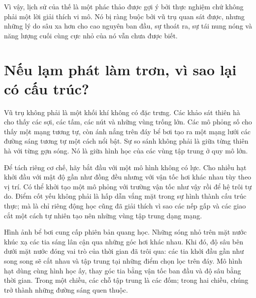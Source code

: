 Vì vậy, lịch sử của thế là một phác thảo được gợi ý bởi thực nghiệm chứ không phải một lời giải thích vi mô. Nó bị ràng buộc bởi vũ trụ quan sát được, nhưng những lý do sâu xa hơn cho cao nguyên ban đầu, sự thoát ra, sự tái nung nóng và năng lượng cuối cùng cực nhỏ của nó vẫn chưa được biết.

\section{Nếu lạm phát làm trơn, vì sao lại có cấu trúc?}

Vũ trụ không phải là một khối khí không có đặc trưng. Các khảo sát thiên hà cho thấy các sợi, các tấm, các nút và những vùng trống lớn. Các mô phỏng số cho thấy một mạng tương tự, còn ánh nắng trên đáy bể bơi tạo ra một mạng lưới các đường sáng tương tự một cách nổi bật. Sự so sánh không phải là giữa từng thiên hà với từng gợn sóng. Nó là giữa hình học của các vùng tập trung ở quy mô lớn.

Để tách riêng cơ chế, hãy bắt đầu với một mô hình không có lực. Cho nhiều hạt khởi đầu với mật độ gần như đồng đều nhưng với vận tốc hơi khác nhau tùy theo vị trí. Có thể khởi tạo một mô phỏng với trường vận tốc như vậy rồi để hệ trôi tự do. Điểm cốt yếu không phải là hấp dẫn vắng mặt trong sự hình thành cấu trúc thực; mà là chỉ riêng động học cũng đã giải thích vì sao các nếp gấp và các giao cắt một cách tự nhiên tạo nên những vùng tập trung dạng mạng.

\begin{classroomqa}
\end{classroomqa}

Hình ảnh bể bơi cung cấp phiên bản quang học. Những sóng nhỏ trên mặt nước khúc xạ các tia sáng lân cận qua những góc hơi khác nhau. Khi đó, độ sâu bên dưới mặt nước đóng vai trò của thời gian đã trôi qua: các tia khởi đầu gần như song song sẽ cắt nhau và tập trung tại những điểm chọn lọc trên đáy. Mô hình hạt dùng cùng hình học ấy, thay góc tia bằng vận tốc ban đầu và độ sâu bằng thời gian. Trong một chiều, các chỗ tập trung là các đốm; trong hai chiều, chúng trở thành những đường sáng quen thuộc.

